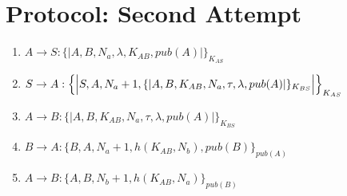 
\section{Protocol: Second Attempt}

\begin{enumerate}
    \item $ A \rightarrow S : \{|A, B, N_a, \lambda, K_{AB}, pub(A)|\}_{K_{AS}}$
    \item $ S \rightarrow A : \Bigl\{\Bigl|S,A, N_a + 1, \{|A,B,K_{AB},N_a, \tau, \lambda, pub(A) |\}_{K_{BS}}\Bigr|\Bigr\}_{K_{AS}}$
    \item $ A \rightarrow B : \{|A,B,K_{AB},N_a, \tau, \lambda, pub(A) |\}_{K_{BS}}$
    \item $ B \rightarrow A : \{B, A, N_a+1, h(K_{AB}, N_b), pub(B)\}_{pub(A)}$
    \item $ A \rightarrow B : \{A, B, N_b+1, h(K_{AB}, N_a)\}_{pub(B)}$

\end{enumerate}